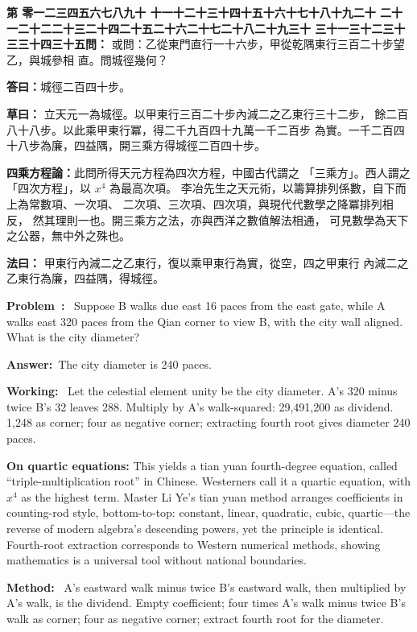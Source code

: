 \documentclass[9pt,a4paper]{article}
\newcounter{probnum}
\newcounter{overallnum}
\newcommand{\chnum}[1]{%
  \ifcase#1 零\or 一\or 二\or 三\or 四\or 五\or 六\or 七\or 八\or 九\or 十\or
    十一\or 十二\or 十三\or 十四\or 十五\or 十六\or 十七\or 十八\or 十九\or 二十\or
    二十一\or 二十二\or 二十三\or 二十四\or 二十五\or 二十六\or 二十七\or 二十八\or 二十九\or 三十\or
    三十一\or 三十二\or 三十三\or 三十四\or 三十五\fi}
\newcommand{\problem}[1]{\stepcounter{probnum}\stepcounter{overallnum}\par\noindent\textbf{\color{volcolor}第\chnum{\value{probnum}}問：}#1\par\vspace{0.15cm}}
\newcommand{\answer}[1]{\par\noindent\textbf{答曰：}#1\par\vspace{0.15cm}}
\newcommand{\working}[1]{\par\noindent\textbf{草曰：}#1\par\vspace{0.15cm}}
\newcommand{\method}[1]{\par\noindent\textbf{法曰：}#1\par\vspace{0.25cm}}
\newcommand{\eproblem}[1]{\par\noindent\textbf{\color{volcolor}Problem~\theoverallnum:}~#1\par\vspace{0.15cm}}
\newcommand{\eanswer}[1]{\par\noindent\textbf{Answer:}~#1\par\vspace{0.15cm}}
\newcommand{\eworking}[1]{\par\noindent\textbf{Working:}~#1\par\vspace{0.15cm}}
\newcommand{\emethod}[1]{\par\noindent\textbf{Method:}~#1\par\vspace{0.25cm}}
\begin{document}
\noindent\begin{minipage}[t]{0.48\textwidth}
\problem{
或問：乙從東門直行一十六步，甲從乾隅東行三百二十步望乙，與城參相
直。問城徑幾何？
}

\answer{城徑二百四十步。}

\working{
立天元一為城徑。以甲東行三百二十步內減二之乙東行三十二步，
餘二百八十八步。以此乘甲東行冪，得二千九百四十九萬一千二百步
為實。一千二百四十八步為廉，四益隅，開三乘方得城徑二百四十步。

\textbf{四乘方程論：}此問所得天元方程為四次方程，中國古代謂之
「三乘方」。西人謂之「四次方程」，以 $x^4$ 為最高次項。
李冶先生之天元術，以籌算排列係數，自下而上為常數項、一次項、
二次項、三次項、四次項，與現代代數學之降冪排列相反，
然其理則一也。開三乘方之法，亦與西洋之數值解法相通，
可見數學為天下之公器，無中外之殊也。
}

\method{
甲東行內減二之乙東行，復以乘甲東行為實，從空，四之甲東行
內減二之乙東行為廉，四益隅，得城徑。
}
\end{minipage}%
\hfill%
\begin{minipage}[t]{0.50\textwidth}
\eproblem{
Suppose B walks due east 16 paces from the east gate, while A walks east 320
paces from the Qian corner to view B, with the city wall aligned. What is
the city diameter?
}

\eanswer{The city diameter is 240 paces.}

\eworking{
Let the celestial element unity be the city diameter. A's 320 minus twice
B's 32 leaves 288. Multiply by A's walk-squared: 29,491,200 as dividend.
1,248 as corner; four as negative corner; extracting fourth root gives
diameter 240 paces.

\textbf{On quartic equations:} This yields a tian yuan fourth-degree equation,
called ``triple-multiplication root'' in Chinese. Westerners call it a
quartic equation, with $x^4$ as the highest term. Master Li Ye's tian yuan
method arranges coefficients in counting-rod style, bottom-to-top: constant,
linear, quadratic, cubic, quartic---the reverse of modern algebra's descending
powers, yet the principle is identical. Fourth-root extraction corresponds
to Western numerical methods, showing mathematics is a universal tool
without national boundaries.
}

\emethod{
A's eastward walk minus twice B's eastward walk, then multiplied by A's walk,
is the dividend. Empty coefficient; four times A's walk minus twice B's walk
as corner; four as negative corner; extract fourth root for the diameter.
}
\end{minipage}
\vspace{0.15cm}
\end{document}
